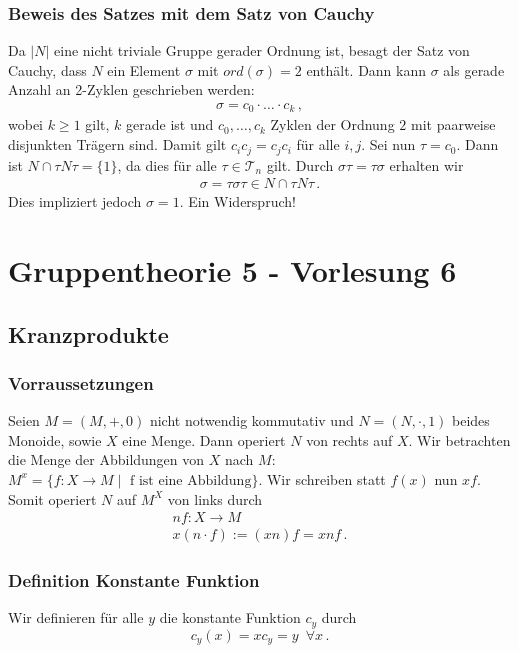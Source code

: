 \documentclass[12pt, german]{article}
\begin{document}
	\subsubsection{Beweis des Satzes mit dem Satz von Cauchy}
	Da $|N|$ eine nicht triviale Gruppe gerader Ordnung ist, besagt der Satz von Cauchy, dass $N$ ein Element $\sigma$ mit $ord(\sigma) = 2$ enthält. 
	Dann kann $\sigma$ als gerade Anzahl an 2-Zyklen geschrieben werden:
	\begin{align*}
		\sigma = c_0 \cdot \ldots \cdot c_k\, ,
	\end{align*} 
	wobei $k\geq 1$ gilt, $k$ gerade ist und $c_0, \ldots, c_k$ Zyklen der Ordnung $2$ mit paarweise disjunkten Trägern sind. Damit gilt $c_ic_j = c_jc_i$ für alle $i,j$. 
	Sei nun $\tau = c_0$. Dann ist $N \cap \tau N \tau = \{1\}$, da dies für alle $\tau \in \mathcal T_n$ gilt. Durch $\sigma\tau = \tau \sigma$ erhalten wir
	\begin{align*}
		\sigma = \tau\sigma\tau \in N\cap \tau N \tau\, .
	\end{align*} 
	Dies impliziert jedoch $\sigma = 1$. Ein Widerspruch! 
	
	\section{Gruppentheorie 5 - Vorlesung 6}
	\subsection{Kranzprodukte}
	\subsubsection{Vorraussetzungen}
	Seien $M = (M, +, 0)$ nicht notwendig kommutativ und $N=(N, \cdot, 1)$ beides Monoide, sowie $X$ eine Menge. 
	Dann operiert $N$ von rechts auf $X$. Wir betrachten die Menge der Abbildungen von $X$ nach $M$: $M^x = \{ f: X \to M \mid \text{ f ist eine Abbildung} \}$. Wir schreiben statt $f(x)$ nun $xf$. 
	Somit operiert $N$ auf $M^X$ von links durch
	\begin{align*}
		nf : X \to M \\ 
		x(n\cdot f) := (xn)f = xnf \, .
	\end{align*}
	\subsubsection{Definition Konstante Funktion}
	Wir definieren für alle $y$ die konstante Funktion $c_y$ durch	$$c_y(x) = xc_y = y \, \, \, \forall x\, .$$ 
	
\end{document}
